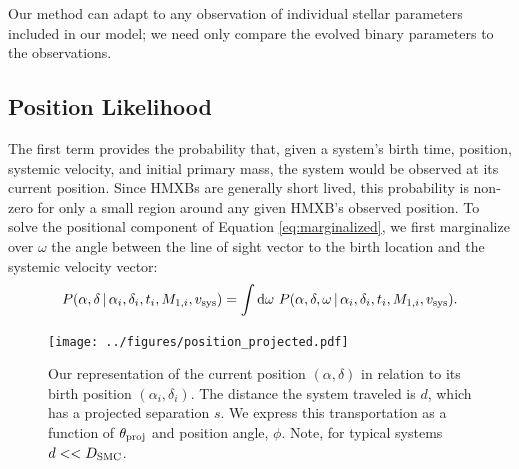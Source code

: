 \documentclass[12pt, preprint]{aastex}
\newcommand{\given}{\,|\,}
\newcommand{\dd}{\mathrm{d}}
\begin{document}
Our method can adapt to any observation of individual stellar parameters included in our model; we need only compare the evolved binary parameters to the observations.


\subsection{Position Likelihood}
The first term provides the probability that, given a system's birth time, position, systemic velocity, and initial primary mass, the system would be observed at its current position. Since HMXBs are generally short lived, this probability is non-zero for only a small region around any given HMXB's observed position. To solve the positional component of Equation \ref{eq:marginalized}, we first marginalize over $\omega$ the angle between the line of sight vector to the birth location and the systemic velocity vector:
\begin{equation}
P(\alpha, \delta \given \alpha_i, \delta_i, t_i, M_{1,i}, v_{\rm sys} ) = \int \dd \omega\ P(\alpha, \delta, \omega \given \alpha_i, \delta_i, t_i, M_{1,i}, v_{\rm sys} ). \label{eq:P_pos_1}
\end{equation}

\begin{figure}[h!]
\begin{center}
\texttt{[image: ../figures/position\_projected.pdf]}
\caption{Our representation of the current position $(\alpha, \delta)$ in relation to its birth position $(\alpha_i, \delta_i)$. The distance the system traveled is $d$, which has a projected separation $s$. We express this transportation as a function of $\theta_{\rm proj}$ and position angle, $\phi$. Note, for typical systems $d << D_{\rm SMC}$.}
\label{fig:position_projection}
\end{center}
\end{figure}
\end{document}
